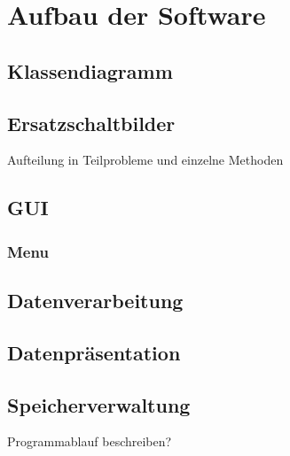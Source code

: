 \section{Aufbau der Software} \label{sec:software}

\subsection{Klassendiagramm} \label{subsec:klassendiagramm}

\subsection{Ersatzschaltbilder} \label{subsec:ersatzschaltbilder}
Aufteilung in Teilprobleme und einzelne Methoden
\subsection{GUI} \label{subsec:gui}
\subsubsection{Menu}\label{menu}

\subsection{Datenverarbeitung} \label{subsec:datenverarbeitung}

\subsection{Datenpräsentation} \label{subsec:datenpräsentation}

\subsection{Speicherverwaltung} \label{subsec:speicherverwaltung}

Programmablauf beschreiben?



